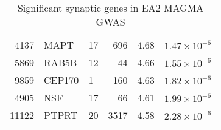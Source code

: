 \begin{table}[ht]
\begin{tabular}{rllrrr}
  4137 & MAPT & 17 & 696 & 4.68 & $1.47 \times 10^{-6}$ \\ 
  5869 & RAB5B & 12 &  44 & 4.66 & $1.55 \times 10^{-6}$ \\ 
  9859 & CEP170 & 1 & 160 & 4.63 & $1.82 \times 10^{-6}$ \\ 
  4905 & NSF & 17 &  66 & 4.61 & $1.99 \times 10^{-6}$ \\ 
  11122 & PTPRT & 20 & 3517 & 4.58 & $2.28 \times 10^{-6}$ \\ 
   \hline
\end{tabular}
\caption{Significant synaptic genes in EA2  MAGMA GWAS} 
\label{tab:Significant synaptic genes in EA2  MAGMA GWAS}
\end{table}


